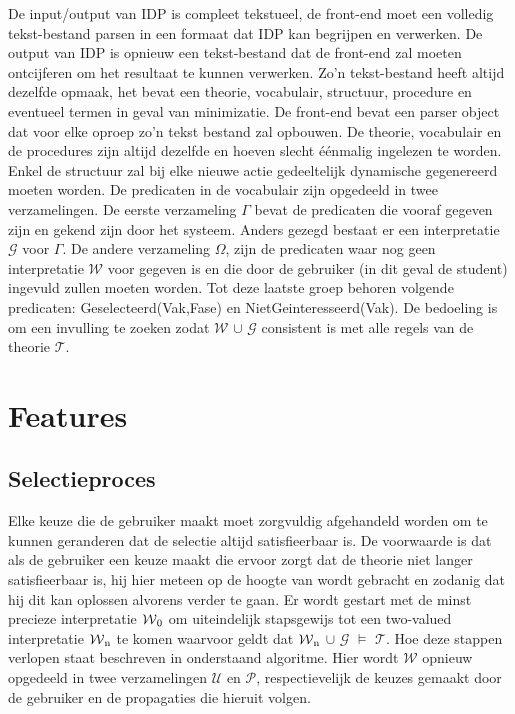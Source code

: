 De input/output van IDP is compleet tekstueel, de front-end moet een volledig tekst-bestand parsen in een formaat dat IDP kan begrijpen en verwerken. De output van IDP is opnieuw een tekst-bestand dat de front-end zal moeten ontcijferen om het resultaat te kunnen verwerken. Zo'n tekst-bestand heeft altijd dezelfde opmaak, het bevat een theorie, vocabulair, structuur, procedure en eventueel termen in geval van minimizatie. De front-end bevat een parser object dat voor elke oproep zo'n tekst bestand zal opbouwen. De theorie, vocabulair en de procedures zijn altijd dezelfde en hoeven slecht \'{e}\'{e}nmalig ingelezen te worden. Enkel de structuur zal bij elke nieuwe actie gedeeltelijk dynamische gegenereerd moeten worden. De predicaten in de vocabulair zijn opgedeeld in twee verzamelingen. De eerste verzameling $\Gamma$ bevat de predicaten die vooraf gegeven zijn en gekend zijn door het systeem. Anders gezegd bestaat er een interpretatie $\mathcal{G}$ voor $\Gamma$. De andere verzameling $\Omega$, zijn de predicaten waar nog geen interpretatie $\mathcal{W}$ voor gegeven is en die door de gebruiker (in dit geval de student) ingevuld zullen moeten worden. Tot deze laatste groep behoren volgende predicaten: Geselecteerd(Vak,Fase) en NietGeinteresseerd(Vak). De bedoeling is om een invulling te zoeken zodat $\mathcal{W}$ $\cup$ $\mathcal{G}$ consistent is met alle regels van de theorie $\mathcal{T}$.


\section{Features}

\subsection{Selectieproces}
Elke keuze die de gebruiker maakt moet zorgvuldig afgehandeld worden om te kunnen geranderen dat de selectie altijd satisfieerbaar is. De voorwaarde is dat als de gebruiker een keuze maakt die ervoor zorgt dat de theorie niet langer satisfieerbaar is, hij hier meteen op de hoogte van wordt gebracht en zodanig dat hij dit kan oplossen alvorens verder te gaan. Er wordt gestart met de minst precieze interpretatie $\mathcal{W}\textsubscript{0}$ om uiteindelijk stapsgewijs tot een two-valued interpretatie $\mathcal{W}\textsubscript{n}$ te komen waarvoor geldt dat $\mathcal{W}\textsubscript{n}$ $\cup$ $\mathcal{G}$ $\models$ $\mathcal{T}$. Hoe deze stappen verlopen staat beschreven in onderstaand algoritme. Hier wordt $\mathcal{W}$ opnieuw opgedeeld in twee verzamelingen $\mathcal{U}$ en $\mathcal{P}$, respectievelijk de keuzes gemaakt door de gebruiker en de propagaties die hieruit volgen. 

